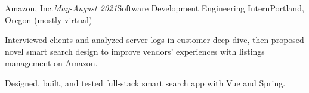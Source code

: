 \begin{rSubsection}{Amazon, Inc.}{\em May-August 2021}{Software Development Engineering Intern}{Portland, Oregon (mostly virtual)}
\item Interviewed clients and analyzed server logs in customer deep dive, then proposed novel smart search design to improve vendors' experiences with listings management on Amazon.
\item Designed, built, and tested full-stack smart search app with Vue and Spring.
\end{rSubsection}